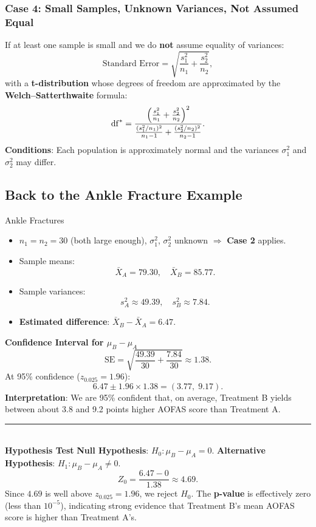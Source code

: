 \documentclass[10pt]{extarticle}
\begin{document}
\subsubsection{Case 4: Small Samples, Unknown Variances, Not Assumed Equal}
If at least one sample is small and we do \textbf{not} assume equality of variances:
$$
\text{Standard Error} = \sqrt{\frac{s_1^2}{n_1} + \frac{s_2^2}{n_2}},
$$
with a \textbf{t-distribution} whose degrees of freedom are approximated by the \textbf{Welch–Satterthwaite} formula:
$$
\mathrm{df}^* = \frac{\Bigl(\frac{s_1^2}{n_1} + \frac{s_2^2}{n_2}\Bigr)^2}{\frac{(s_1^2/n_1)^2}{n_1 - 1} + \frac{(s_2^2/n_2)^2}{n_2 - 1}}.
$$
\textbf{Conditions}: Each population is approximately normal and the variances $\sigma_1^2$ and $\sigma_2^2$ may differ.


\subsection{Back to the Ankle Fracture Example}
\begin{examplebox}{Ankle Fractures}{}
    \begin{itemize}
        \item $n_1 = n_2 = 30$ (both large enough), $\sigma_1^2$, $\sigma_2^2$ unknown $\Rightarrow$ \textbf{Case 2} applies.
        \item Sample means:
        $$
        \bar{X}_A = 79.30,\quad \bar{X}_B = 85.77.
        $$
        \item Sample variances:
        $$
        s_A^2 \approx 49.39,\quad s_B^2 \approx 7.84.
        $$
        \item \textbf{Estimated difference}: $\bar{X}_B - \bar{X}_A = 6.47$.
    \end{itemize}
    \textbf{Confidence Interval for $\mu_B - \mu_A$}
    $$
    \text{SE} = \sqrt{\frac{49.39}{30} + \frac{7.84}{30}} \approx 1.38.
    $$
    At 95\% confidence ($z_{0.025}=1.96$):
    $$
    6.47 \pm 1.96 \times 1.38 = (3.77,\; 9.17).
    $$
\textbf{Interpretation}: We are 95\% confident that, on average, Treatment B yields between about 3.8 and 9.2 points higher AOFAS score than Treatment A.

\noindent\rule{\textwidth}{1pt} \\ [2ex]
\textbf{Hypothesis Test}
\textbf{Null Hypothesis}: $H_0 : \mu_B - \mu_A = 0$.  
\textbf{Alternative Hypothesis}: $H_1 : \mu_B - \mu_A \neq 0$.
$$
Z_0 = \frac{6.47 - 0}{1.38} \approx 4.69.
$$
Since $4.69$ is well above $z_{0.025}=1.96$, we reject $H_0$. The \textbf{p-value} is effectively zero (less than $10^{-5}$), indicating strong evidence that Treatment B’s mean AOFAS score is higher than Treatment A’s.
\end{examplebox}
\end{document}
